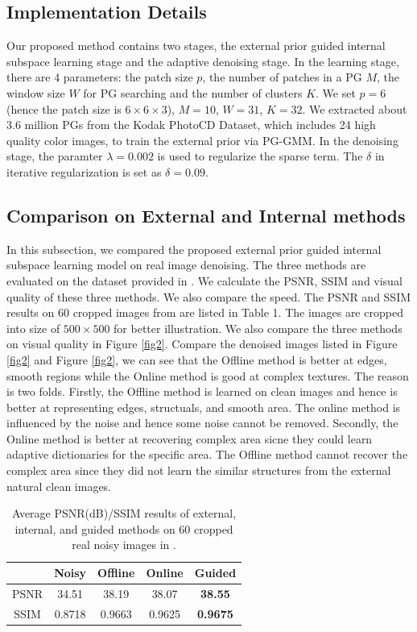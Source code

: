 \documentclass[10pt,twocolumn,letterpaper]{article}
\begin{document}
\subsection{Implementation Details}
Our proposed method contains two stages, the external prior guided internal subspace learning stage and the adaptive denoising stage. In the learning stage, there are 4 parameters: the patch size $p$, the number of patches in a PG $M$, the window size $W$ for PG searching and the number of clusters $K$. We set $p = 6$ (hence the patch size is $6\times 6 \times 3$), $M=10$, $W = 31$, $K=32$. We extracted about 3.6 million PGs from the Kodak PhotoCD Dataset, which includes 24 high quality color images, to train the external prior via PG-GMM. In the denoising stage, the paramter $\lambda = 0.002$ is used to regularize the sparse term. The $\delta$ in iterative regularization is set as $\delta = 0.09$.

\subsection{Comparison on External and Internal methods}
In this subsection, we compared the proposed external prior guided internal subspace learning model on real image denoising. The three methods are evaluated on the dataset provided in \cite{crosschannel2016}. We calculate the PSNR, SSIM \cite{ssim} and visual quality of these three methods. We also compare the speed. The PSNR and SSIM results on 60 cropped images from \cite{crosschannel2016} are listed in Table 1. The images are cropped into size of $500\times 500$ for better illustration. We also compare the three methods on visual quality in Figure \ref{fig2}. Compare the denoised images listed in Figure \ref{fig2} and Figure \ref{fig2}, we can see that the Offline method is better at edges, smooth regions while the Online method is good at complex textures. The reason is two folds. Firstly, the Offline method is learned on clean images and hence is better at representing edges, structuals, and smooth area. The online method is influenced by the noise and hence some noise cannot be removed. Secondly, the Online method is better at recovering complex area sicne they could learn adaptive dictionaries for the specific area. The Offline method cannot recover the complex area since they did not learn the similar structures from the external natural clean images.

\begin{table}\label{tab1}
\caption{Average PSNR(dB)/SSIM results of external, internal, and guided methods on 60 cropped real noisy images in \cite{crosschannel2016}.}
\label{tab1}
\begin{center}
\renewcommand\arraystretch{1}
\begin{tabular}{|c||c|c|c|c|}
\hline
 & \textbf{Noisy} &\textbf{Offline} &\textbf{Online} &\textbf{Guided}  
\\
\hline
PSNR & 34.51 & 38.19 & 38.07 & \textbf{38.55} 
\\
\hline
SSIM & 0.8718 &  0.9663   & 0.9625 & \textbf{0.9675}
\\
\hline
\end{tabular}
\end{center}
\end{table}
\end{document}
